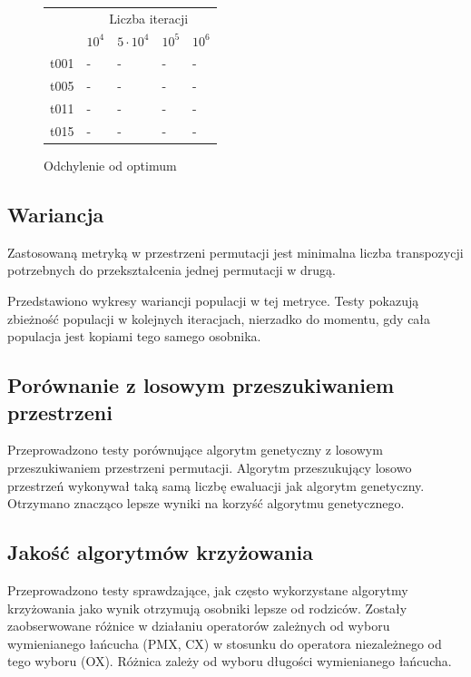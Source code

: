 \documentclass[12pt]{article}
\begin{document}
\begin{figure}
  \centering
    \begin{tabular}{l|l|l|l|l|} \cline{2-5}
     & \multicolumn{4}{|c|}{Liczba iteracji} \\ \cline{2-5}
     & $10^4$ & $5\cdot 10^4$ & $10^5$ & $10^6$ \\ \hline
    \multicolumn{1}{|c|}{t001} 	& -  & -  & - & - \\ \hline
    \multicolumn{1}{|c|}{t005} 	& -  & -  & - & - \\ \hline
    \multicolumn{1}{|c|}{t011} 	& -  & -  & - & - \\ \hline
    \multicolumn{1}{|c|}{t015} 	& -  & -  & - & - \\ \hline
    \end{tabular}
  \caption{Odchylenie od optimum}
  \label{tab:extreme}
\end{figure}

\subsection{Wariancja}

Zastosowaną metryką w przestrzeni permutacji jest minimalna liczba
transpozycji potrzebnych do przekształcenia jednej permutacji w drugą.

Przedstawiono wykresy wariancji populacji w tej metryce. Testy
pokazują zbieżność populacji w kolejnych iteracjach, nierzadko do
momentu, gdy cała populacja jest kopiami tego samego osobnika.

\subsection{Porównanie z losowym przeszukiwaniem przestrzeni}

Przeprowadzono testy porównujące algorytm genetyczny z losowym
przeszukiwaniem przestrzeni permutacji. Algorytm przeszukujący losowo
przestrzeń wykonywał taką samą liczbę ewaluacji jak algorytm
genetyczny. Otrzymano znacząco lepsze wyniki na korzyść algorytmu genetycznego.

\subsection{Jakość algorytmów krzyżowania}

Przeprowadzono testy sprawdzające, jak często wykorzystane algorytmy
krzyżowania jako wynik otrzymują osobniki lepsze od rodziców. Zostały
zaobserwowane różnice w działaniu operatorów zależnych od wyboru
wymienianego łańcucha (PMX, CX) w stosunku do operatora niezależnego
od tego wyboru (OX). Różnica zależy od wyboru długości wymienianego łańcucha.
\end{document}
